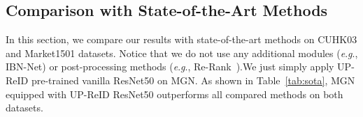 \documentclass[10pt,twocolumn,letterpaper]{article}
\newcommand{\egno}{\textit{e}.\textit{g}.} %
\begin{document}
\subsection{Comparison with State-of-the-Art Methods}

In this section, we compare our results with state-of-the-art methods on CUHK03 and Market1501 datasets. Notice that we do not use any additional modules (\egno, IBN-Net) or post-processing methods (\egno, Re-Rank~\cite{zhong2017re}).We just simply apply UP-ReID pre-trained vanilla ResNet50 on MGN. As shown in Table~\ref{tab:sota}, MGN equipped with UP-ReID ResNet50 outperforms all compared methods on both datasets.




\end{document}
